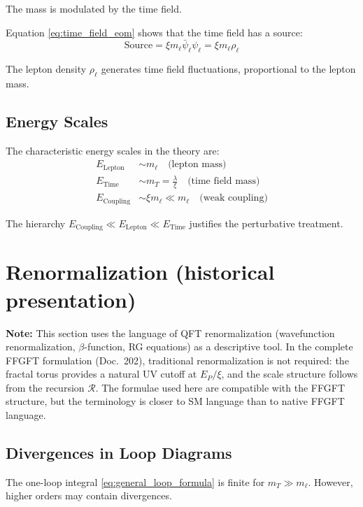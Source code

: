 	The mass is modulated by the time field.
	
	Equation \eqref{eq:time_field_eom} shows that the time field has a source:
	\begin{equation}
		\text{Source} = \xi m_\ell \bar{\psi}_\ell \psi_\ell = \xi m_\ell \rho_\ell
		\label{eq:source_term}
	\end{equation}
	
	The lepton density $\rho_\ell$ generates time field fluctuations, proportional to the lepton mass.
	
	\subsection{Energy Scales}
	
	The characteristic energy scales in the theory are:
	\begin{align}
		E_{\text{Lepton}} &\sim m_\ell \quad \text{(lepton mass)} \label{eq:lepton_scale} \\
		E_{\text{Time}} &\sim m_T = \frac{\lambda}{\xi} \quad \text{(time field mass)} \label{eq:time_scale} \\
		E_{\text{Coupling}} &\sim \xi m_\ell \ll m_\ell \quad \text{(weak coupling)} \label{eq:coupling_scale}
	\end{align}
	
	The hierarchy $E_{\text{Coupling}} \ll E_{\text{Lepton}} \ll E_{\text{Time}}$ justifies the perturbative treatment.
	
	\section{Renormalization (historical presentation)}

\textbf{Note:} This section uses the language of QFT renormalization (wavefunction renormalization, $\beta$-function, RG equations) as a descriptive tool. In the complete FFGFT formulation (Doc.~202), traditional renormalization is not required: the fractal torus provides a natural UV cutoff at $E_P/\xi$, and the scale structure follows from the recursion $\mathcal{R}$. The formulae used here are compatible with the FFGFT structure, but the terminology is closer to SM language than to native FFGFT language.
	
	\subsection{Divergences in Loop Diagrams}
	
	The one-loop integral \eqref{eq:general_loop_formula} is finite for $m_T \gg m_\ell$. However, higher orders may contain divergences.
	
